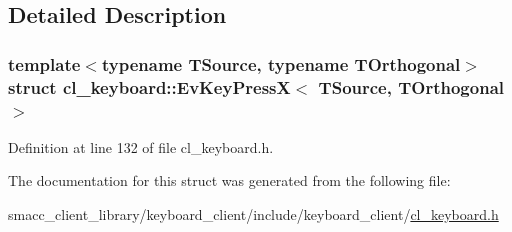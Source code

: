 \subsection{Detailed Description}
\subsubsection*{template$<$typename T\+Source, typename T\+Orthogonal$>$\newline
struct cl\+\_\+keyboard\+::\+Ev\+Key\+Press\+X$<$ T\+Source, T\+Orthogonal $>$}



Definition at line 132 of file cl\+\_\+keyboard.\+h.



The documentation for this struct was generated from the following file\+:\begin{DoxyCompactItemize}
\item 
smacc\+\_\+client\+\_\+library/keyboard\+\_\+client/include/keyboard\+\_\+client/\hyperlink{cl__keyboard_8h}{cl\+\_\+keyboard.\+h}\end{DoxyCompactItemize}
